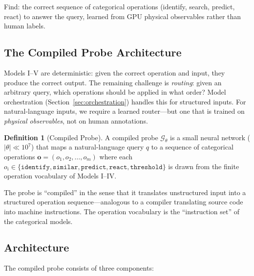 \documentclass[11pt,twocolumn,a4paper]{article}
\theoremstyle{definition}
\newtheorem{definition}[theorem]{Definition}
\theoremstyle{remark}
\begin{document}
Find: the correct sequence of categorical operations (identify, search, predict, react) to answer the query, learned from GPU physical observables rather than human labels.

\subsection{The Compiled Probe Architecture}

Models I--V are deterministic: given the correct operation and input, they produce the correct output. The remaining challenge is \emph{routing}: given an arbitrary query, which operations should be applied in what order? Model orchestration (Section~\ref{sec:orchestration}) handles this for structured inputs. For natural-language inputs, we require a learned router---but one that is trained on \emph{physical observables}, not on human annotations.

\begin{definition}[Compiled Probe]
\label{def:compiled_probe}
A compiled probe $\mathcal{G}_\theta$ is a small neural network ($|\theta| \ll 10^7$) that maps a natural-language query $q$ to a sequence of categorical operations $\mathbf{o} = (o_1, o_2, \ldots, o_m)$ where each $o_i \in \{\texttt{identify}, \texttt{similar}, \texttt{predict}, \texttt{react}, \texttt{threshold}\}$ is drawn from the finite operation vocabulary of Models I--IV.
\end{definition}

The probe is ``compiled'' in the sense that it translates unstructured input into a structured operation sequence---analogous to a compiler translating source code into machine instructions. The operation vocabulary is the ``instruction set'' of the categorical models.

\subsection{Architecture}

The compiled probe consists of three components:
\end{document}
